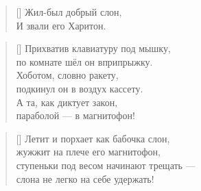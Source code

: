 \documentclass[a5paper,11pt]{memoir}
\begin{document}
\clearpage
\hfill
\clearpage

\BgThispage

\PlainPoemTitle
{}
\settowidth{\versewidth}{ступеньки под весом скрипят и трещат ---}
\begin{verse}[\versewidth]
Жил-был добрый слон,\\
И звали его Харитон.
\end{verse}

\begin{verse}[\versewidth]
Прихватив клавиатуру под мышку,\\
по комнате шёл он вприпрыжку.\\
Хоботом, словно ракету,\\
подкинул он в воздух кассету.\\
А та, как диктует закон,\\
параболой --- в магнитофон!
\end{verse}

\begin{verse}[\versewidth]
Летит и порхает как бабочка слон,\\
жужжит на плече его магнитофон,\\
ступеньки под весом начинают трещать --- \\
слона не легко на себе удержать!
\end{verse}
\end{document}
